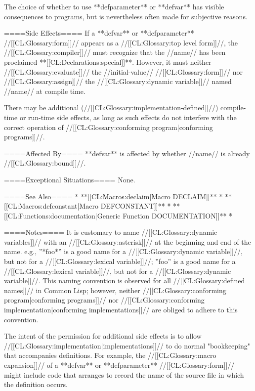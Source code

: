 The choice of whether to use **defparameter** or **defvar** has visible consequences to programs, but is nevertheless often made for subjective reasons.

====Side Effects====
If a **defvar** or **defparameter** //[[CL:Glossary:form]]// appears as a //[[CL:Glossary:top level form]]//, the //[[CL:Glossary:compiler]]// must recognize that the //name// has been proclaimed **[[CL:Declarations:special]]**. However, it must neither //[[CL:Glossary:evaluate]]// the //initial-value// //[[CL:Glossary:form]]// nor //[[CL:Glossary:assign]]// the //[[CL:Glossary:dynamic variable]]// named //name// at compile time.

There may be additional (//[[CL:Glossary:implementation-defined]]//) compile-time or run-time side effects, as long as such effects do not interfere with the correct operation of //[[CL:Glossary:conforming program|conforming programs]]//.

====Affected By====
**defvar** is affected by whether //name// is already //[[CL:Glossary:bound]]//.

====Exceptional Situations====
None.

====See Also====
  * **[[CL:Macros:declaim|Macro DECLAIM]]**
  * **[[CL:Macros:defconstant|Macro DEFCONSTANT]]**
  * **[[CL:Functions:documentation|Generic Function DOCUMENTATION]]**
  * {\secref\Compilation}

====Notes====
It is customary to name //[[CL:Glossary:dynamic variables]]// with an //[[CL:Glossary:asterisk]]// at the beginning and end of the name. e.g., ''*foo*'' is a good name for a //[[CL:Glossary:dynamic variable]]//, but not for a //[[CL:Glossary:lexical variable]]//; ''foo'' is a good name for a //[[CL:Glossary:lexical variable]]//, but not for a //[[CL:Glossary:dynamic variable]]//. This naming convention is observed for all //[[CL:Glossary:defined names]]// in Common Lisp; however, neither //[[CL:Glossary:conforming program|conforming programs]]// nor //[[CL:Glossary:conforming implementation|conforming implementations]]// are obliged to adhere to this convention.

The intent of the permission for additional side effects is to allow //[[CL:Glossary:implementation|implementations]]// to do normal "bookkeeping" that accompanies definitions. For example, the //[[CL:Glossary:macro expansion]]// of a **defvar** or **defparameter** //[[CL:Glossary:form]]// might include code that arranges to record the name of the source file in which the definition occurs.

